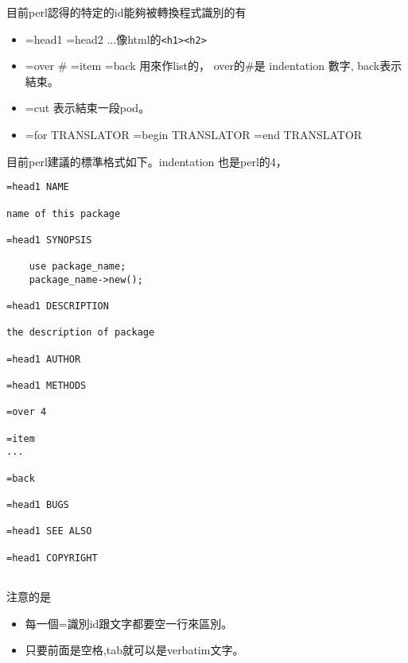     目前perl認得的特定的id能夠被轉換程式識別的有
    \begin{itemize}
    \item =head1 =head2 ...像html的\verb=<h1><h2>=
    \item =over \# =item =back 用來作list的， over的\#是 indentation 數字, back表示結束。
    \item =cut 表示結束一段pod。
    \item =for TRANSLATOR =begin TRANSLATOR =end TRANSLATOR
    \end{itemize}
    目前perl建議的標準格式如下。indentation 也是perl的4，
    \begin{verbatim}
=head1 NAME

name of this package

=head1 SYNOPSIS

	use package_name;
	package_name->new();

=head1 DESCRIPTION

the description of package

=head1 AUTHOR

=head1 METHODS

=over 4

=item
...

=back

=head1 BUGS

=head1 SEE ALSO

=head1 COPYRIGHT


    \end{verbatim}

    注意的是
    \begin{itemize}
    \item 每一個=識別id跟文字都要空一行來區別。
    \item 只要前面是空格,tab就可以是verbatim文字。
    \end{itemize}
